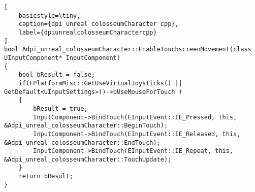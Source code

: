 \begin{lstlisting}[
	basicstyle=\tiny, 
	caption={dpi unreal colosseumCharacter cpp}, 
	label={dpiunrealcolosseumCharactercpp}
]
bool Adpi_unreal_colosseumCharacter::EnableTouchscreenMovement(class UInputComponent* InputComponent)
{
	bool bResult = false;
	if(FPlatformMisc::GetUseVirtualJoysticks() || GetDefault<UInputSettings>()->bUseMouseForTouch )
	{
		bResult = true;
		InputComponent->BindTouch(EInputEvent::IE_Pressed, this, &Adpi_unreal_colosseumCharacter::BeginTouch);
		InputComponent->BindTouch(EInputEvent::IE_Released, this, &Adpi_unreal_colosseumCharacter::EndTouch);
		InputComponent->BindTouch(EInputEvent::IE_Repeat, this, &Adpi_unreal_colosseumCharacter::TouchUpdate);
	}
	return bResult;
}

\end{lstlisting}